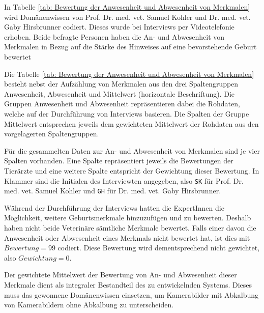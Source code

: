 In Tabelle \ref{tab: Bewertung der Anwesenheit und Abwesenheit von Merkmalen} wird Domänenwissen von Prof. Dr. med. vet. Samuel Kohler und  Dr. med. vet. Gaby Hirsbrunner codiert. Dieses wurde bei Interviews per Videotelefonie erhoben. Beide befragte Personen haben die An- und Abwesenheit von Merkmalen in Bezug auf die Stärke des Hinweises auf eine bevorstehende Geburt bewertet

Die Tabelle \ref{tab: Bewertung der Anwesenheit und Abwesenheit von Merkmalen} besteht nebst der Aufzählung von Merkmalen aus den drei Spaltengruppen \glqq{}Anwesenheit\grqq{}, \glqq{}Abwesenheit\grqq{} und \glqq{}Mittelwert\grqq{} (horizontale Beschriftung). Die Gruppen \glqq{}Anwesenheit\grqq{} und \glqq{}Abwesenheit\grqq{} repräsentieren dabei die Rohdaten, welche auf der Durchführung von Interviews basieren. Die Spalten der Gruppe \glqq{}Mittelwert\grqq{} entsprechen jeweils dem gewichteten Mittelwert der Rohdaten aus den vorgelagerten Spaltengruppen.

Für die gesammelten Daten zur An- und Abwesenheit von Merkmalen sind je vier Spalten vorhanden. Eine Spalte repräsentiert jeweils die Bewertungen der Tierärzte und eine weitere Spalte entspricht der Gewichtung dieser Bewertung. In Klammer sind die Initialen des Interviewten angegeben, also \texttt{SK} für Prof. Dr. med. vet. Samuel Kohler und  \texttt{GH} für Dr. med. vet. Gaby Hirsbrunner.

Während der Durchführung der Interviews hatten die ExpertInnen die Möglichkeit, weitere Geburtsmerkmale hinzuzufügen und zu bewerten. Deshalb haben nicht beide Veterinäre sämtliche Merkmale bewertet. Falls einer davon die Anwesenheit oder Abwesenheit eines Merkmals nicht bewertet hat, ist dies mit $Bewertung=99$ codiert. Diese Bewertung wird dementsprechend nicht gewichtet, also \newline $Gewichtung=0$. 

Der gewichtete Mittelwert der Bewertung von An- und Abwesenheit dieser Merkmale dient als integraler Bestandteil des zu entwickelnden Systems. Dieses muss das gewonnene Domänenwissen einsetzen, um Kamerabilder mit Abkalbung von Kamerabildern ohne Abkalbung zu unterscheiden.



